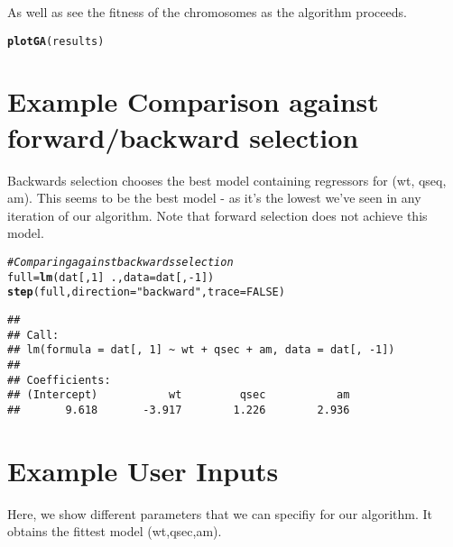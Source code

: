 \documentclass{article}\usepackage[]{graphicx}\usepackage[]{color}
\makeatletter
\newcommand{\hlnum}[1]{\textcolor[rgb]{0.686,0.059,0.569}{#1}}%
\newcommand{\hlstr}[1]{\textcolor[rgb]{0.192,0.494,0.8}{#1}}%
\newcommand{\hlcom}[1]{\textcolor[rgb]{0.678,0.584,0.686}{\textit{#1}}}%
\newcommand{\hlopt}[1]{\textcolor[rgb]{0,0,0}{#1}}%
\newcommand{\hlstd}[1]{\textcolor[rgb]{0.345,0.345,0.345}{#1}}%
\newcommand{\hlkwb}[1]{\textcolor[rgb]{0.69,0.353,0.396}{#1}}%
\newcommand{\hlkwc}[1]{\textcolor[rgb]{0.333,0.667,0.333}{#1}}%
\newcommand{\hlkwd}[1]{\textcolor[rgb]{0.737,0.353,0.396}{\textbf{#1}}}%
\newenvironment{kframe}{%
 \def\at@end@of@kframe{}%
 \ifinner\ifhmode%
  \def\at@end@of@kframe{\end{minipage}}%
  \begin{minipage}{\columnwidth}%
 \fi\fi%
 \def\FrameCommand##1{\hskip\@totalleftmargin \hskip-\fboxsep
 \colorbox{shadecolor}{##1}\hskip-\fboxsep
     \hskip-\linewidth \hskip-\@totalleftmargin \hskip\columnwidth}%
 \MakeFramed {\advance\hsize-\width
   \@totalleftmargin\z@ \linewidth\hsize
   \@setminipage}}%
 {\par\unskip\endMakeFramed%
 \at@end@of@kframe}
\newenvironment{knitrout}{}{} %
\makeatother
\begin{document}
As well as see the fitness of the chromosomes as the algorithm proceeds.

\begin{knitrout}
\color{fgcolor}\begin{kframe}
\begin{alltt}
\hlkwd{plotGA}\hlstd{(results)}
\end{alltt}


{\ttfamily\noindent\bfseries{}}\end{kframe}
\end{knitrout}


\section*{Example Comparison against forward/backward selection}

Backwards selection chooses the best model containing regressors for (wt, qseq, am). This seems to be the best model - as it's the lowest we've seen in any iteration of our algorithm. Note that forward selection does not achieve this model.
\begin{knitrout}
\color{fgcolor}\begin{kframe}
\begin{alltt}
\hlcom{# Comparing against backwards selection}
\hlstd{full}\hlkwb{=}\hlkwd{lm}\hlstd{(dat[,}\hlnum{1}\hlstd{]}\hlopt{~}\hlstd{.,} \hlkwc{data}\hlstd{=dat[,}\hlopt{-}\hlnum{1}\hlstd{])}
\hlkwd{step}\hlstd{(full,} \hlkwc{direction}\hlstd{=}\hlstr{"backward"}\hlstd{,}\hlkwc{trace}\hlstd{=}\hlnum{FALSE}\hlstd{)}
\end{alltt}
\begin{verbatim}
## 
## Call:
## lm(formula = dat[, 1] ~ wt + qsec + am, data = dat[, -1])
## 
## Coefficients:
## (Intercept)           wt         qsec           am  
##       9.618       -3.917        1.226        2.936
\end{verbatim}
\end{kframe}
\end{knitrout}


\section*{Example User Inputs}

Here, we show different parameters that we can specifiy for our algorithm. It obtains the fittest model (wt,qsec,am).
\end{document}
